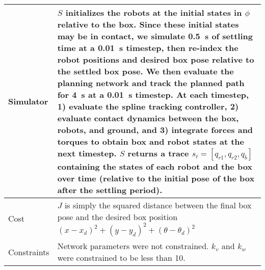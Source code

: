 \begin{table}[tb]
\begin{tabular}{|p{2.5cm}|p{14cm}|}
        Simulator            & $S$ initializes the robots at the initial states in $\phi$ relative to the box. Since these initial states may be in contact, we simulate \SI{0.5}{s} of settling time at a \SI{0.01}{s} timestep, then re-index the robot positions and desired box pose relative to the settled box pose. We then evaluate the planning network and track the planned path for \SI{4}{s} at a \SI{0.01}{s} timestep. At each timestep, 1) evaluate the spline tracking controller, 2) evaluate contact dynamics between the box, robots, and ground, and 3) integrate forces and torques to obtain box and robot states at the next timestep. $S$ returns a trace $s_t = [q_{r1}, q_{r2}, q_{b}]$ containing the states of each robot and the box over time (relative to the initial pose of the box after the settling period). \\ \hline
        Cost                 & $J$ is simply the squared distance between the final box pose and the desired box position $(x - x_d)^2 + (y - y_d)^2 + (\theta - \theta_d)^2$                                                                                                                                                                                                                                                                                                                                                                                                                                                                                                                                                                                                                                                                     \\ \hline
        Constraints          & Network parameters were not constrained. $k_v$ and $k_w$ were constrained to be less than 10.                                                                                                                                                                                                                                                                                                                                                                                                                                                                                                                                                                                                                                                                                                                      \\ \hline
    \end{tabular}
\end{table}

